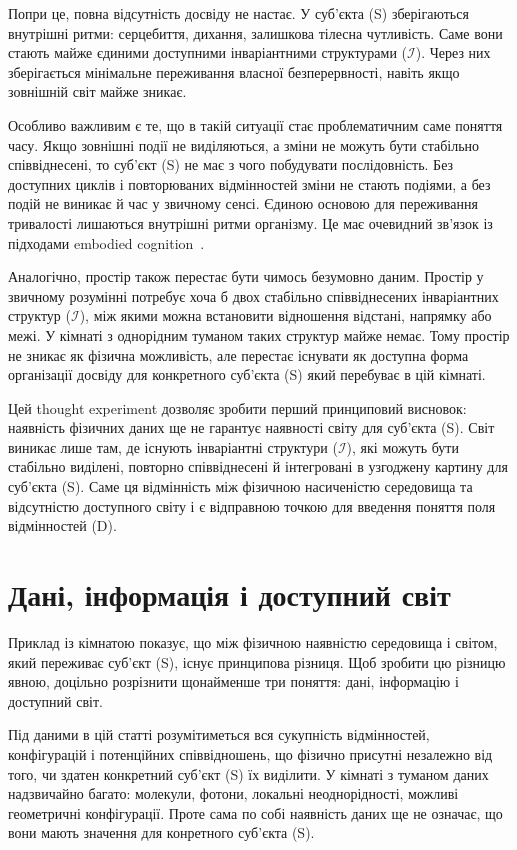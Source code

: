 \documentclass[aps,prd,onecolumn,nofootinbib,superscriptaddress]{revtex4-2}
\begin{document}
Попри це, повна відсутність досвіду не настає. У суб’єкта (S) зберігаються внутрішні ритми: серцебиття, дихання, залишкова тілесна чутливість. Саме вони стають майже єдиними доступними інваріантними структурами ($\mathcal{I}$). Через них зберігається мінімальне переживання власної безперервності, навіть якщо зовнішній світ майже зникає.

Особливо важливим є те, що в такій ситуації стає проблематичним саме поняття часу. Якщо зовнішні події не виділяються, а зміни не можуть бути стабільно співвіднесені, то суб’єкт (S) не має з чого побудувати послідовність. Без доступних циклів і повторюваних відмінностей зміни не стають подіями, а без подій не виникає й час у звичному сенсі. Єдиною основою для переживання тривалості лишаються внутрішні ритми організму. Це має очевидний зв’язок із підходами embodied cognition~\cite{VarelaThompsonRosch1991}.

Аналогічно, простір також перестає бути чимось безумовно даним. Простір у звичному розумінні потребує хоча б двох стабільно співвіднесених інваріантних структур ($\mathcal{I}$), між якими можна встановити відношення відстані, напрямку або межі. У кімнаті з однорідним туманом таких структур майже немає. Тому простір не зникає як фізична можливість, але перестає існувати як доступна форма організації досвіду для конкретного суб’єкта (S) який перебуває в цій кімнаті.

Цей thought experiment дозволяє зробити перший принциповий висновок: наявність фізичних даних ще не гарантує наявності світу для суб’єкта (S). Світ виникає лише там, де існують інваріантні структури ($\mathcal{I}$), які можуть бути стабільно виділені, повторно співвіднесені й інтегровані в узгоджену картину для суб’єкта (S). Саме ця відмінність між фізичною насиченістю середовища та відсутністю доступного світу і є відправною точкою для введення поняття поля відмінностей (D).

\section{Дані, інформація і доступний світ}
Приклад із кімнатою показує, що між фізичною наявністю середовища і світом, який переживає суб’єкт (S), існує принципова різниця. Щоб зробити цю різницю явною, доцільно розрізнити щонайменше три поняття: дані, інформацію і доступний світ.

Під даними в цій статті розумітиметься вся сукупність відмінностей, конфігурацій і потенційних співвідношень, що фізично присутні незалежно від того, чи здатен конкретний суб’єкт (S) їх виділити. У кімнаті з туманом даних надзвичайно багато: молекули, фотони, локальні неоднорідності, можливі геометричні конфігурації. Проте сама по собі наявність даних ще не означає, що вони мають значення для конретного суб’єкта (S).
\end{document}
